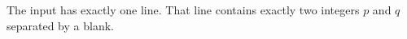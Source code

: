 The input has exactly one line.
That line contains exactly two integers $p$ and $q$ separated by a blank.
